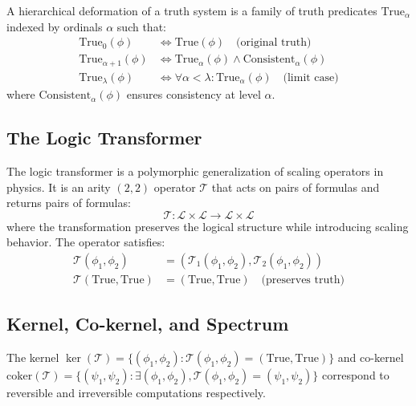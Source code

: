 \begin{definition}
\label{def:hierarchical-deformation}
A hierarchical deformation of a truth system is a family of truth predicates $\text{True}_\alpha$ indexed by ordinals $\alpha$ such that:
\begin{align}
\text{True}_0(\phi) &\Leftrightarrow \text{True}(\phi) \quad \text{(original truth)} \\
\text{True}_{\alpha+1}(\phi) &\Leftrightarrow \text{True}_\alpha(\phi) \land \text{Consistent}_\alpha(\phi) \\
\text{True}_\lambda(\phi) &\Leftrightarrow \forall \alpha < \lambda: \text{True}_\alpha(\phi) \quad \text{(limit case)}
\end{align}
where $\text{Consistent}_\alpha(\phi)$ ensures consistency at level $\alpha$.
\end{definition}

\subsection{The Logic Transformer}

\begin{definition}
\label{def:logic-transformer}
The logic transformer is a polymorphic generalization of scaling operators in physics. It is an arity $(2,2)$ operator $\mathcal{T}$ that acts on pairs of formulas and returns pairs of formulas:
\[
\mathcal{T}: \mathcal{L} \times \mathcal{L} \to \mathcal{L} \times \mathcal{L}
\]
where the transformation preserves the logical structure while introducing scaling behavior. The operator satisfies:
\begin{align}
\mathcal{T}(\phi_1, \phi_2) &= (\mathcal{T}_1(\phi_1, \phi_2), \mathcal{T}_2(\phi_1, \phi_2)) \\
\mathcal{T}(\text{True}, \text{True}) &= (\text{True}, \text{True}) \quad \text{(preserves truth)}
\end{align}
\end{definition}

\subsection{Kernel, Co-kernel, and Spectrum}

\begin{definition}
\label{def:kernel-cokernel}
The kernel $\ker(\mathcal{T}) = \{(\phi_1, \phi_2) : \mathcal{T}(\phi_1, \phi_2) = (\text{True}, \text{True})\}$ and co-kernel $\text{coker}(\mathcal{T}) = \{(\psi_1, \psi_2) : \exists (\phi_1, \phi_2), \mathcal{T}(\phi_1, \phi_2) = (\psi_1, \psi_2)\}$ correspond to reversible and irreversible computations respectively.
\end{definition}


